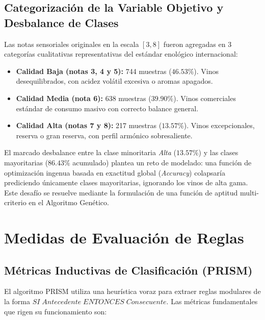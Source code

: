 \documentclass{article}
\begin{document}
\subsection{Categorización de la Variable Objetivo y Desbalance de Clases}

Las notas sensoriales originales en la escala $[3, 8]$ fueron agregadas en 3 categorías cualitativas representativas del estándar enológico internacional:
\begin{itemize}
    \item \textbf{Calidad Baja (notas 3, 4 y 5):} 744 muestras ($46.53\%$). Vinos desequilibrados, con acidez volátil excesiva o aromas apagados.
    \item \textbf{Calidad Media (nota 6):} 638 muestras ($39.90\%$). Vinos comerciales estándar de consumo masivo con correcto balance general.
    \item \textbf{Calidad Alta (notas 7 y 8):} 217 muestras ($13.57\%$). Vinos excepcionales, reserva o gran reserva, con perfil armónico sobresaliente.
\end{itemize}

El marcado desbalance entre la clase minoritaria \textit{Alta} ($13.57\%$) y las clases mayoritarias ($86.43\%$ acumulado) plantea un reto de modelado: una función de optimización ingenua basada en exactitud global (\textit{Accuracy}) colapsaría prediciendo únicamente clases mayoritarias, ignorando los vinos de alta gama. Este desafío se resuelve mediante la formulación de una función de aptitud multi-criterio en el Algoritmo Genético.


\section{Medidas de Evaluación de Reglas}

\subsection{Métricas Inductivas de Clasificación (PRISM)}

El algoritmo PRISM \cite{cendrowska1987prism} utiliza una heurística voraz para extraer reglas modulares de la forma $SI \; Antecedente \; ENTONCES \; Consecuente$. Las métricas fundamentales que rigen su funcionamiento son:
\end{document}
